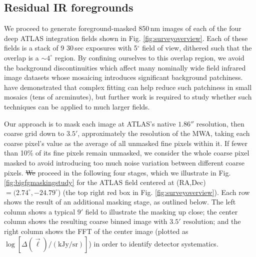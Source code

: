 \documentclass[numberedappendix]{emulateapj}
\providecommand{\DIFadd}[1]{{\protect\color{blue}\uwave{#1}}} %
\providecommand{\DIFdel}[1]{{\protect\color{red}\sout{#1}}}                      %
\providecommand{\DIFaddbegin}{} %
\providecommand{\DIFaddend}{} %
\providecommand{\DIFdelbegin}{} %
\providecommand{\DIFdelend}{} %
\begin{document}
\subsection{Residual IR foregrounds}
\label{sec:resirfg}

We proceed to generate foreground-masked 850\,nm images of each of the four deep ATLAS integration fields shown in Fig. \ref{fig:surveyoverview}. Each of these fields is a stack of 9 30\,sec exposures with 5$^\circ$ field of view, dithered such that the overlap is a $\sim4^\circ$ region. By confining ourselves to this overlap region, we avoid the background discontinuities which affect many nominally wide field infrared image datasets whose mosaicing introduces significant background patchiness. \citet{mw15} have demonstrated that complex fitting \citep{fixen00} can help reduce such patchiness in small mosaics (tens of arcminutes), but further work is required to study whether such techniques can be applied to much larger fields.

Our approach is to mask each image at ATLAS's native $1.86''$ resolution, then coarse grid down to $3.5'$, approximately the resolution of the MWA, taking each coarse pixel's value as the average of all unmasked fine pixels within it. If fewer than 10\% of its fine pixels remain unmasked, we consider the whole coarse pixel masked to avoid introducing too much noise variation between different coarse pixels. \DIFdelbegin \DIFdel{We }\DIFdelend \DIFaddbegin \DIFadd{For illustrative purposes, we }\DIFaddend proceed in the following four stages, which we illustrate in Fig. \ref{fig:bigfgmaskingstudy} for the ATLAS field centered at (RA,Dec)$=(2.74^\circ, -24.79^\circ$) (the top right red box in Fig. \ref{fig:surveyoverview}). Each row shows the result of an additional masking stage, as outlined below. The left column shows a typical $9'$ field to illustrate the masking up close; the center column shows the resulting coarse binned image with $3.5'$ resolution; and the right column shows the FFT of the center image (plotted as \DIFdelbegin \DIFdel{$\log[\Delta(\vec{\ell})/(\text{kJy/sr})]$}\DIFdelend \DIFaddbegin \DIFadd{$\log[\Delta(\ell)/(\text{kJy/sr})]$}\DIFaddend ) in order to identify detector systematics. 
\end{document}

